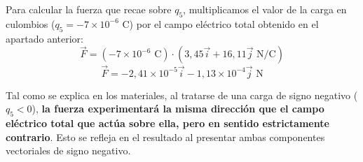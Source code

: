 \documentclass[11pt, a4paper]{article}
\newenvironment{problem}[1][Cuestión]{
		\vspace{0.5cm}
		\noindent{\Large\bfseries #1} \par\vspace{0.5cm}
}{
		\vspace{0.5cm}
}
\begin{document}
\begin{problem}[Cuestión 2]
\begin{enumerate}[label=\alph*)]
{					Para calcular la fuerza que recae sobre $q_5$, multiplicamos el valor de la carga en culombios ($q_5 = -7 \times 10^{-6} \text{ C}$) por el campo eléctrico total obtenido en el apartado anterior:
					$$\vec{F} = (-7 \times 10^{-6} \text{ C}) \cdot (3,45 \vec{i} + 16,11 \vec{j} \text{ N/C})$$
					$$\boxed{\vec{F} = -2,41 \times 10^{-5} \vec{i} - 1,13 \times 10^{-4} \vec{j} \text{ N}}$$

					Tal como se explica en los materiales, al tratarse de una carga de signo negativo ($q_5 < 0$), \textbf{la fuerza experimentará la misma dirección que el campo eléctrico total que actúa sobre ella, pero en sentido estrictamente contrario}. Esto se refleja en el resultado al presentar ambas componentes vectoriales de signo negativo.
				}
		\end{enumerate}
	\end{problem}
\end{document}
